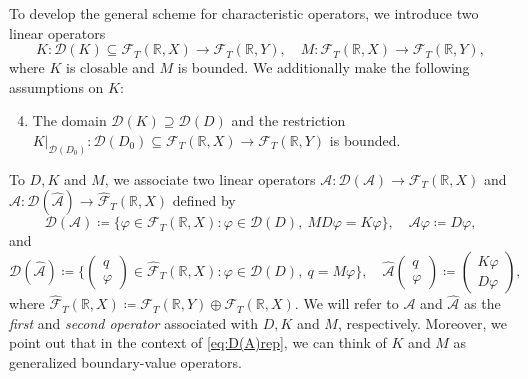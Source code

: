 \documentclass[english]{myarticle}
\begin{document}
\begin{sloppypar}
To develop the general scheme for characteristic operators, we introduce two linear operators
\begin{equation*}
    K : \mathcal{D}(K) \subseteq \mathcal{F}_T(\mathbb{R},X) \to \mathcal{F}_T(\mathbb{R},Y), \quad M : \mathcal{F}_T(\mathbb{R},X) \to \mathcal{F}_T(\mathbb{R},Y),
\end{equation*}
where $K$ is closable and $M$ is bounded. We additionally make the following assumptions on $K$:
\begin{enumerate}[label=({H}{{\arabic*}})]
\setcounter{enumi}{3}
    \item \label{hyp:K} The domain $\mathcal{D}(K) \supseteq \mathcal{D}(D)$ and the restriction $K|_{\mathcal{D}(D_0)} : \mathcal{D}(D_0) \subseteq \mathcal{F}_T(\mathbb{R},X) \to \mathcal{F}_T(\mathbb{R},Y)$ is bounded. 
\end{enumerate}
To $D,K$ and $M$, we associate two linear operators $\mathcal{A} : \mathcal{D}(\mathcal{A}) \to \mathcal{F}_T(\mathbb{R},X)$ and $\hat{\mathcal{A}} : \mathcal{D}(\hat{\mathcal{A}}) \to \hat{\mathcal{F}}_T(\mathbb{R},X)$ defined by
\begin{equation} \label{eq:D(A)rep}
    \mathcal{D}(\mathcal{A}) \coloneqq \{ \varphi \in \mathcal{F}_T(\mathbb{R},X) : \varphi \in \mathcal{D}(D), \ MD\varphi = K \varphi \}, \quad \mathcal{A}\varphi \coloneqq D\varphi,
\end{equation}
and
\begin{equation} \label{eq:D(Ahat)rep}
    \mathcal{D}(\hat{\mathcal{A}}) \coloneqq \bigg \{ \begin{pmatrix}
    q\\
    \varphi
    \end{pmatrix}
    \in \hat{\mathcal{F}}_T(\mathbb{R},X) : \varphi \in \mathcal{D}(D),\ q = M\varphi \bigg \}, \quad \hat{\mathcal{A}}
    \begin{pmatrix}
    q\\
    \varphi
    \end{pmatrix}
    \coloneqq
    \begin{pmatrix}
    K\varphi \\
    D\varphi
    \end{pmatrix},
\end{equation}
where $\hat{\mathcal{F}}_T(\mathbb{R},X) \coloneqq {\mathcal{F}}_T(\mathbb{R},Y) \oplus {\mathcal{F}}_T(\mathbb{R},X)$. 
We will refer to $\mathcal{A}$ and $\hat{\mathcal{A}}$ as the \emph{first} and \emph{second operator} associated with $D,K$ and $M$, respectively. Moreover, we point out that in the context of \eqref{eq:D(A)rep}, we can think of $K$ and $M$ as generalized boundary-value operators. 


\end{sloppypar}
\end{document}
